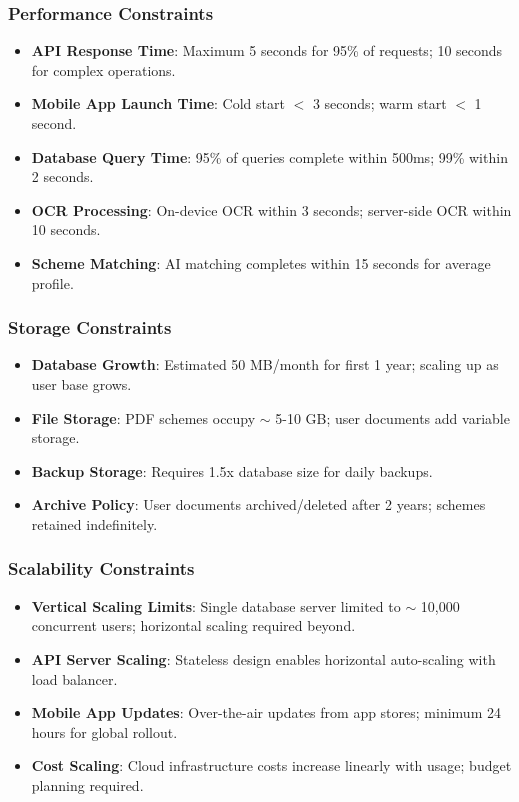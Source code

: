 \subsubsection{Performance Constraints}
\begin{itemize}
    \item \textbf{API Response Time}: Maximum 5 seconds for 95\% of requests; 10 seconds for complex operations.
    \item \textbf{Mobile App Launch Time}: Cold start $<$ 3 seconds; warm start $<$ 1 second.
    \item \textbf{Database Query Time}: 95\% of queries complete within 500ms; 99\% within 2 seconds.
    \item \textbf{OCR Processing}: On-device OCR within 3 seconds; server-side OCR within 10 seconds.
    \item \textbf{Scheme Matching}: AI matching completes within 15 seconds for average profile.
\end{itemize}

\subsubsection{Storage Constraints}
\begin{itemize}
    \item \textbf{Database Growth}: Estimated 50 MB/month for first 1 year; scaling up as user base grows.
    \item \textbf{File Storage}: PDF schemes occupy $\sim$ 5-10 GB; user documents add variable storage.
    \item \textbf{Backup Storage}: Requires 1.5x database size for daily backups.
    \item \textbf{Archive Policy}: User documents archived/deleted after 2 years; schemes retained indefinitely.
\end{itemize}

\subsubsection{Scalability Constraints}
\begin{itemize}
    \item \textbf{Vertical Scaling Limits}: Single database server limited to $\sim$ 10,000 concurrent users; horizontal scaling required beyond.
    \item \textbf{API Server Scaling}: Stateless design enables horizontal auto-scaling with load balancer.
    \item \textbf{Mobile App Updates}: Over-the-air updates from app stores; minimum 24 hours for global rollout.
    \item \textbf{Cost Scaling}: Cloud infrastructure costs increase linearly with usage; budget planning required.
\end{itemize}

